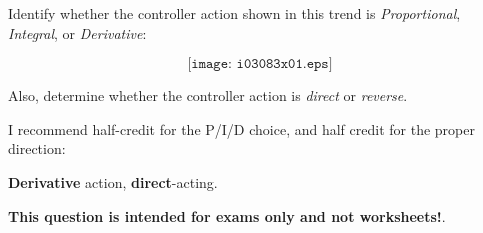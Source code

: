 

Identify whether the controller action shown in this trend is {\it Proportional}, {\it Integral}, or {\it Derivative}:

$$\texttt{[image: i03083x01.eps]}$$

Also, determine whether the controller action is {\it direct} or {\it reverse}.







I recommend half-credit for the P/I/D choice, and half credit for the proper direction:

\vskip 10pt

{\bf Derivative} action, {\bf direct}-acting.







{\bf This question is intended for exams only and not worksheets!}.



